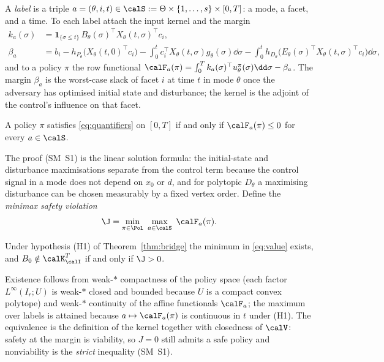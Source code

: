 A \emph{label} is a triple $a=(\theta,i,t)\in\calS:=\Theta\times\{1,\dots,s\}\times[0,T]$: a mode, a facet, and a time. To each label attach the input kernel and the margin
\begin{align}
k_a(\sigma)&=\mathbf 1_{\{\sigma\le t\}}\,B_\theta(\sigma)^\top X_\theta(t,\sigma)^\top c_i,\label{eq:kernel}\\
\beta_a&=b_i-h_{P_\theta}\!\bigl(X_\theta(t,0)^\top c_i\bigr)-\int_0^t c_i^\top X_\theta(t,\sigma)g_\theta(\sigma)\dd\sigma-\int_0^t h_{D_\theta}\!\bigl(E_\theta(\sigma)^\top X_\theta(t,\sigma)^\top c_i\bigr)\dd\sigma,\label{eq:beta}
\end{align}
and to a policy $\pi$ the row functional $\calF_a(\pi)=\int_0^T k_a(\sigma)^\top u^\pi_\theta(\sigma)\dd\sigma-\beta_a$. The margin $\beta_a$ is the worst-case slack of facet $i$ at time $t$ in mode $\theta$ once the adversary has optimised initial state and disturbance; the kernel is the adjoint of the control's influence on that facet.

\begin{proposition}\label{prop:rows}
A policy $\pi$ satisfies \eqref{eq:quantifiers} on $[0,T]$ if and only if $\calF_a(\pi)\le0$ for every $a\in\calS$.
\end{proposition}

The proof (SM~S1) is the linear solution formula: the initial-state and disturbance maximisations separate from the control term because the control signal in a mode does not depend on $x_0$ or $d$, and for polytopic $D_\theta$ a maximising disturbance can be chosen measurably by a fixed vertex order. Define the \emph{minimax safety violation}
\begin{equation}\label{eq:value}
\J=\min_{\pi\in\Pol}\ \max_{a\in\calS}\ \calF_a(\pi).
\end{equation}

\begin{proposition}\label{prop:value}
Under hypothesis \textup{(H1)} of Theorem~\ref{thm:bridge} the minimum in \eqref{eq:value} exists, and $B_0\notin\calK^T_\calI$ if and only if $\J>0$.
\end{proposition}

Existence follows from weak-$\ast$ compactness of the policy space (each factor $L^\infty(I_r;U)$ is weak-$\ast$ closed and bounded because $U$ is a compact convex polytope) and weak-$\ast$ continuity of the affine functionals $\calF_a$; the maximum over labels is attained because $a\mapsto\calF_a(\pi)$ is continuous in $t$ under (H1). The equivalence is the definition of the kernel together with closedness of $\calV$: safety at the margin is viability, so $J=0$ still admits a safe policy and nonviability is the \emph{strict} inequality (SM~S1).


